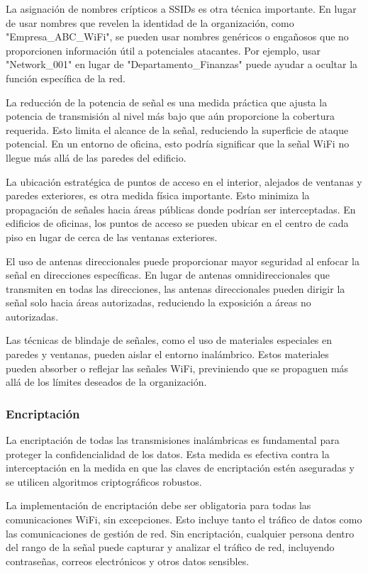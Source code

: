 La asignación de nombres crípticos a SSIDs es otra técnica importante. En lugar de usar nombres que revelen la identidad de la organización, como "Empresa\_ABC\_WiFi", se pueden usar nombres genéricos o engañosos que no proporcionen información útil a potenciales atacantes. Por ejemplo, usar "Network\_001" en lugar de "Departamento\_Finanzas" puede ayudar a ocultar la función específica de la red.

La reducción de la potencia de señal es una medida práctica que ajusta la potencia de transmisión al nivel más bajo que aún proporcione la cobertura requerida. Esto limita el alcance de la señal, reduciendo la superficie de ataque potencial. En un entorno de oficina, esto podría significar que la señal WiFi no llegue más allá de las paredes del edificio.

La ubicación estratégica de puntos de acceso en el interior, alejados de ventanas y paredes exteriores, es otra medida física importante. Esto minimiza la propagación de señales hacia áreas públicas donde podrían ser interceptadas. En edificios de oficinas, los puntos de acceso se pueden ubicar en el centro de cada piso en lugar de cerca de las ventanas exteriores.

El uso de antenas direccionales puede proporcionar mayor seguridad al enfocar la señal en direcciones específicas. En lugar de antenas omnidireccionales que transmiten en todas las direcciones, las antenas direccionales pueden dirigir la señal solo hacia áreas autorizadas, reduciendo la exposición a áreas no autorizadas.

Las técnicas de blindaje de señales, como el uso de materiales especiales en paredes y ventanas, pueden aislar el entorno inalámbrico. Estos materiales pueden absorber o reflejar las señales WiFi, previniendo que se propaguen más allá de los límites deseados de la organización.

\subsubsection{Encriptación}

La encriptación de todas las transmisiones inalámbricas es fundamental para proteger la confidencialidad de los datos. Esta medida es efectiva contra la interceptación en la medida en que las claves de encriptación estén aseguradas y se utilicen algoritmos criptográficos robustos.

La implementación de encriptación debe ser obligatoria para todas las comunicaciones WiFi, sin excepciones. Esto incluye tanto el tráfico de datos como las comunicaciones de gestión de red. Sin encriptación, cualquier persona dentro del rango de la señal puede capturar y analizar el tráfico de red, incluyendo contraseñas, correos electrónicos y otros datos sensibles.

